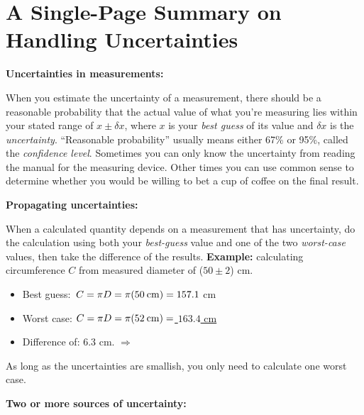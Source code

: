 \section{A Single-Page Summary on Handling Uncertainties}
\label{uncertainty}

\textbf{Uncertainties in measurements:}
\vspace{-.8\parskip}

When you estimate the uncertainty of a measurement, there should be a reasonable probability that the actual value of what you're measuring lies within your stated range of $x \pm \delta x$, where $x$ is your \textit{best guess} of its value and $\delta x$ is the \textit{uncertainty}.  ``Reasonable probability'' usually means either 67\% or 95\%, called the \textit{confidence level}.  Sometimes you can only know the uncertainty from reading the manual for the measuring device.  Other times you can use common sense to determine whether you would be willing to bet a cup of coffee on the final result.
\vspace{+0.15cm}

\textbf{Propagating uncertainties:}
\vspace{-.8\parskip}

When a calculated quantity depends on a measurement that has uncertainty, do the calculation using both your \textit{best-guess} value and one of the two \textit{worst-case} values, then take the difference of the results.  \textbf{Example:} calculating circumference $C$ from measured diameter of ($50\pm2$) cm.
\begin{itemize}\itemsep1pt
\vspace{-0.35cm}
	\item Best guess: $\,C=\pi D =\pi(50 \:\rm{cm}) = 157.1$ cm
	\item Worst case: $C=\pi D =\pi(52 \:\rm{cm}) =$\underline{ $163.4$  cm}
\vspace{-0.10cm}
	\item Difference of:        \hspace{100pt}                   6.3 cm. $\Longrightarrow$ 
\end{itemize}
\vspace{-0.35cm}
As long as the uncertainties are smallish, you only need to calculate one worst case.
\vspace{+0.15cm}

\textbf{Two or more sources of uncertainty:}
\vspace{-0.8\parskip}

